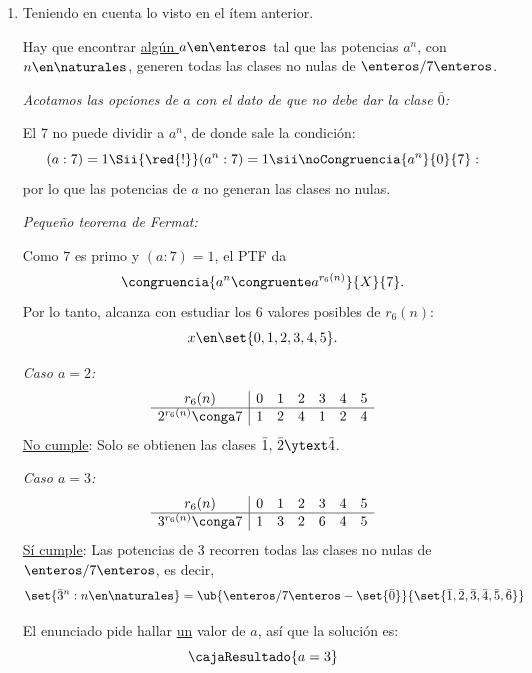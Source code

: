 \begin{enumerate}[label = \roman*)]

  \item
        Teniendo en cuenta lo visto en el ítem anterior.

        Hay que encontrar \ul{algún $a \en \enteros$} tal que las potencias $a^n$, con $n \en \naturales$,
        generen todas las clases no nulas de $\enteros/7\enteros$.

        \bigskip

        \textit{Acotamos las opciones de $a$ con el dato de que no debe dar la clase $\bar{0}$:}

        El 7 no puede dividir a $a^n$, de donde sale la condición:
        $$
          (a:7) = 1
          \Sii{\red{!}}
          (a^n:7) = 1
          \sii
          \noCongruencia{a^n}{0}{7}:
        $$
        por lo que las potencias de $a$ no generan las clases no nulas.

        \bigskip

        \textit{Pequeño teorema de Fermat:}

        Como $7$ es primo y $(a:7) = 1$, el PTF da
        $$
          \congruencia{a^n \congruente a^{r_6(n)}}{X}{7}.
        $$
        Por lo tanto, alcanza con estudiar los $6$ valores posibles de $r_6(n)$:
        $$
          x \en \set{0,1,2,3,4,5}.
        $$

        \textit{Caso $a = 2$:}
        $$
          \begin{array}{c|cccccc}
            r_6(n)            & 0 & 1 & 2 & 3 & 4 & 5 \\ \hline
            2^{r_6(n)}\conga7 & 1 & 2 & 4 & 1 & 2 & 4
          \end{array}
        $$
        \ul{No cumple}: Solo se obtienen las clases
        $\bar{1},\, \bar{2} \ytext \bar{4}$.

        \textit{Caso $a = 3$:}
        $$
          \begin{array}{c|cccccc}
            r_6(n)             & 0 & 1 & 2 & 3 & 4 & 5 \\ \hline
            3^{r_6(n)} \conga7 & 1 & 3 & 2 & 6 & 4 & 5
          \end{array}
        $$
        \ul{Sí cumple}: Las potencias de $3$ recorren todas las clases
        no nulas de $\enteros/7\enteros$, es decir,
        $$
          \set{\bar{3}^n : n \en \naturales} =
          \ub{
            \enteros/7\enteros - \set{\bar{0}}
          }{
            \set{\bar{1},\bar{2},\bar{3},\bar{4},\bar{5},\bar{6}}
          }
        $$

        El enunciado pide hallar \ul{un} valor de $a$, así  que la solución es:
        $$
          \cajaResultado{
            a = 3
          }
        $$
\end{enumerate}

\begin{aportes}
  \item {}
  \item {}
  \item {}
\end{aportes}
